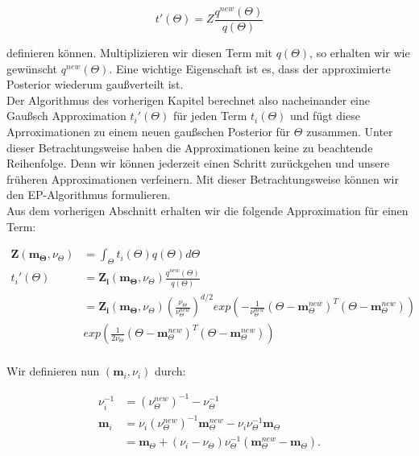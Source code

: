 \documentclass[12pt,a4paper]{scrartcl}
\numberwithin{equation}{section}
\begin{document}
{  \begin{equation}
   t'(\Theta) = Z \frac{q^{new}(\Theta)}{q(\Theta)}
  \end{equation}
  
  definieren können. Multiplizieren wir diesen Term mit $q(\Theta)$, so erhalten wir wie gewünscht $q^{new}(\Theta)$.
  Eine wichtige Eigenschaft ist es, dass der approximierte Posterior wiederum gaußverteilt ist. \\
  Der Algorithmus des vorherigen Kapitel berechnet also nacheinander eine Gaußsch Approximation $t_i'(\Theta)$ für jeden 
  Term $t_i(\Theta)$ und fügt diese Aprroximationen zu einem neuen gaußschen Posterior für $\Theta$ zusammen.
  Unter dieser Betrachtungsweise haben die Approximationen keine zu beachtende Reihenfolge. Denn wir können jederzeit
  einen Schritt zurückgehen und unsere früheren Approximationen verfeinern. Mit dieser Betrachtungsweise können wir den EP-Algorithmus
  formulieren. \\
  Aus dem vorherigen Abschnitt erhalten wir die folgende Approximation für einen Term: 
  
  \begin{equation}
  \begin{split}
   \mathbf{Z}(\mathbf{m_{\Theta}}, \nu_{\Theta}) &= \int_{\Theta} t_i(\Theta) q(\Theta) d \Theta \\
   t_i'(\Theta) &= \mathbf{Z_i}(\mathbf{m_{\Theta}}, \nu_{\Theta}) \frac{q^{new}(\Theta)}{q(\Theta)} \\
   &= \mathbf{Z_i}(\mathbf{m_{\Theta}}, \nu_{\Theta}) (\frac{\nu_{\Theta}}{\nu_{\Theta}^{new}})^{d/2} exp(-\frac{1}{\nu_{\Theta}^{new}} (\Theta - \mathbf{m}_{\Theta}^{new})^T (\Theta - \mathbf{m}_{\Theta}^{new}))\\
   &exp( \frac{1}{2 \nu_{\Theta}} (\Theta - \mathbf{m}_{\Theta}^{new})^T (\Theta - \mathbf{m}_{\Theta}^{new})) \\
   \end{split}
  \end{equation}

  Wir definieren nun $(\mathbf{m}_i, \nu_i)$ durch:
  
  \begin{equation}
  \begin{split}
   \nu_i^{-1} &= (\nu_{\Theta}^{new})^{-1} - \nu_{\Theta}^{-1} \\
   \mathbf{m}_i &= \nu_i(\nu_{\Theta}^{new})^{-1} \mathbf{m}_{\Theta}^{new} - \nu_i \nu_{\Theta}^{-1} \mathbf{m}_{\Theta} \\
   &= \mathbf{m}_{\Theta} + (\nu_i - \nu_{\Theta}) \nu_{\Theta}^{-1}(\mathbf{m}_{\Theta}^{new} - \mathbf{m}_{\Theta}). \\
  \end{split}
  \end{equation}

}
\end{document}
